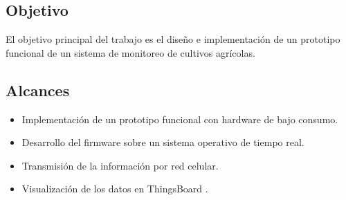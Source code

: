 \subsection{Objetivo}
El objetivo principal del trabajo es el diseño e implementación de un prototipo funcional de un sistema de monitoreo de cultivos agrícolas.
\subsection{Alcances}

\begin{itemize}
  \item Implementación de un prototipo funcional con hardware de bajo consumo. 	
  \item Desarrollo del firmware sobre un sistema operativo de tiempo real.
  \item Transmisión de la información por red celular.
  \item Visualización de los datos en ThingsBoard \citep{THINGSBOARD}.
\end{itemize}